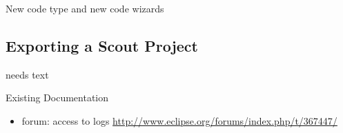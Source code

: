 \documentclass[a4paper,10pt,twoside]{book}
\begin{document}
New code type and new code wizards

\subsection{Exporting a Scout Project}
needs text

\noindent Existing Documentation
\begin{itemize}
  \item forum: access to logs \url{http://www.eclipse.org/forums/index.php/t/367447/}
\end{itemize}

\ifx\wholebook\relax\else
   
   
\end{document}
